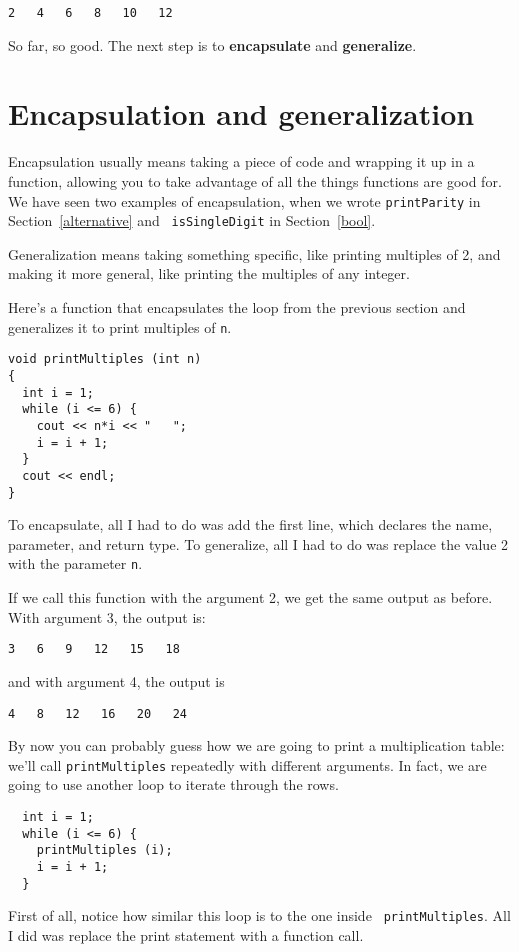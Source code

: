 \begin{lstlisting}
2   4   6   8   10   12
\end{lstlisting}
%
So far, so good.  The next step is to {\bf encapsulate} and {\bf
generalize}.

\section {Encapsulation and generalization}

Encapsulation usually means taking a piece of code and wrapping it up
in a function, allowing you to take advantage of all the things functions
are good for.  We have seen two examples of encapsulation, when we
wrote {\tt printParity} in Section~\ref{alternative} and {\tt
isSingleDigit} in Section~\ref{bool}.

Generalization means taking something specific, like printing
multiples of 2, and making it more general, like printing the
multiples of any integer.


Here's a function that encapsulates the loop from the previous
section and generalizes it to print multiples of {\tt n}.

\begin{lstlisting}
void printMultiples (int n)
{
  int i = 1;
  while (i <= 6) {
    cout << n*i << "   ";
    i = i + 1;
  }
  cout << endl;
}
\end{lstlisting}
%
To encapsulate, all I had to do was add the first line,
which declares the name, parameter,
and return type.  To generalize, all I had to do was replace
the value 2 with the parameter {\tt n}.

If we call this function with the argument 2, we get the same
output as before.  With argument 3, the output is:

\begin{lstlisting}
3   6   9   12   15   18
\end{lstlisting}
%
and with argument 4, the output is

\begin{lstlisting}
4   8   12   16   20   24 
\end{lstlisting}
%
By now you can probably guess how we are going to print a
multiplication table: we'll call {\tt printMultiples} repeatedly with
different arguments.  In fact, we are going to use another loop to
iterate through the rows.

\begin{lstlisting}
  int i = 1;
  while (i <= 6) {
    printMultiples (i);
    i = i + 1;
  }    
\end{lstlisting}
%
First of all, notice how similar this loop is to the one inside {\tt
printMultiples}.  All I did was replace the print statement with a
function call.

